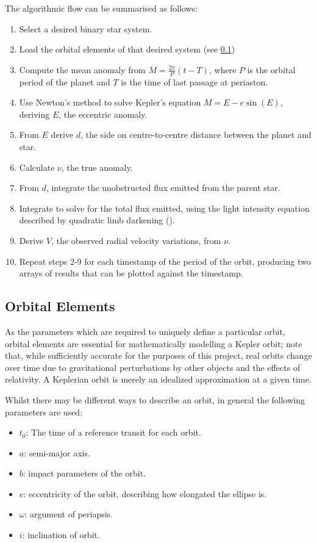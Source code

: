 \documentclass[11pt]{article}
\begin{document}
The algorithmic flow can be summarised as follows: 
\begin{enumerate}
	\item Select a desired binary star system.
	\item Load the orbital elements of that desired system (see \ref{orbital-elements}) 
	\item Compute the mean anomaly from \(M = \frac{2\pi}{P}(t-T)\), where \(P\) is the orbital period of the planet and \(T\) is the time of last passage at periaston.
	\item Use Newton's method to solve Kepler's equation \(M =E - e\sin(E)\), deriving \(E\), the eccentric anomaly. 
	\item From \(E\) derive \(d\), the side on centre-to-centre distance between the planet and star. 
	\item Calculate \(\nu\), the true anomaly. 
	\item From \(d\), integrate the unobstructed flux emitted from the parent star. 
	\item Integrate to solve for the total flux emitted, using the light intensity equation described by quadratic limb darkening (\cite{Mandel}). 
	\item Derive \(V\), the observed radial velocity variations, from \(\nu\). 
	\item Repeat steps 2-9 for each timestamp of the period of the orbit, producing two arrays of results that can be plotted against the	timestamp.
\end{enumerate}

    \hypertarget{orbital-elements}{%
\subsection{Orbital Elements}\label{orbital-elements}}

As the parameters which are required to uniquely define a particular
orbit, orbital elements are essential for mathematically modelling a
Kepler orbit; note that, while sufficiently accurate for the purposes of
this project, real orbits change over time due to gravitational
perturbations by other objects and the effects of relativity. A
Keplerian orbit is merely an idealized approximation at a given time.

Whilst there may be different ways to describe an orbit, in general the
following parameters are used: 

\begin{itemize}
	\item \(t_{0}\): The time of a reference transit for each orbit.
	\item \(a\): semi-major axis.
	\item \(b\): impact parameters of the orbit.
	\item \(e\): eccentricity of the orbit, describing how elongated the ellipse is.
	\item \(\omega\): argument of periapsis.
	\item \(i\): inclination of orbit.
\end{itemize}
\end{document}
